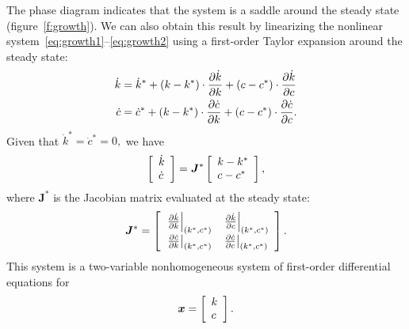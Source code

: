 \documentclass[letterpaper,12pt,leqno]{article}
\begin{document}
The phase diagram indicates that the system is a saddle around the steady state (figure~\ref{f:growth}). We can also obtain this result by linearizing the nonlinear system~\eqref{eq:growth1}--\eqref{eq:growth2} using a first-order Taylor expansion around the steady state:
\begin{align*}
\dot{k} &=\dot{k}^{*} +\left( k-k^{*} \right) \cdot \frac{\partial \dot{k}}{\partial k}+\left( c-c^{*} \right)\cdot \frac{\partial \dot{k}}{\partial c} \\
\dot{c} &=\dot{c}^{*} +\left( k-k^{*} \right)\cdot  \frac{\partial \dot{c}}{\partial k}+\left( c-c^{*} \right)\cdot \frac{\partial \dot{c}}{\partial c}.
\end{align*}
Given that $\dot{k}^{*} =\dot{c}^{*} =0,$ we have 
\begin{equation*}
\left[ \begin{array}{l}
\dot{k}\\ 
\dot{c}
\end{array} \right] =\bm{J}^{*}\left[ 
\begin{array}{l}
k-k^{*} \\ 
c-c^{*}
\end{array} \right],
\end{equation*}
where $\bm{J}^{*}$ is the Jacobian matrix evaluated at the steady state:
\begin{equation*}
\bm{J}^{*}=\left[ 
\begin{array}{ll}
\left.\frac{\partial \dot{k}}{\partial k}\right\vert_{(k^{*},c^{*})}  & \left.\frac{\partial \dot{k}}{\partial c}\right\vert_{(k^{*},c^{*})} \\ 
\left.\frac{\partial \dot{c}}{\partial k}\right\vert_{(k^{*},c^{*})} & \left.\frac{\partial \dot{c}}{\partial c}\right\vert_{(k^{*},c^{*})}
\end{array} \right].
\end{equation*}
This system is a two-variable nonhomogeneous system of first-order differential equations
for \[\bm{x}=\left[ \begin{array}{l}
k\\ 
c
\end{array} \right].\]
\end{document}
